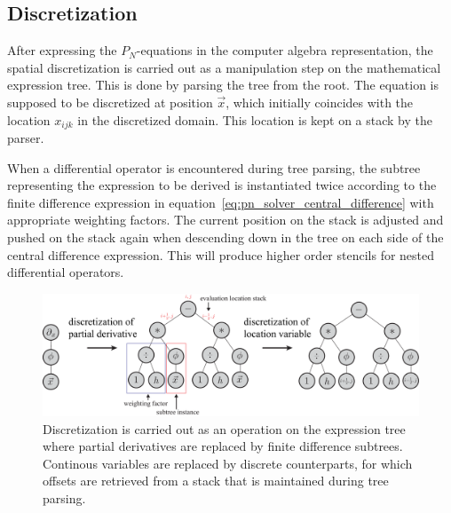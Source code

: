 \subsection{Discretization}
\label{sec:pn_stencil_gen}

After expressing the $P_N$-equations in the computer algebra representation, the spatial discretization is carried out as a manipulation step on the mathematical expression tree. This is done by parsing the tree from the root. The equation is supposed to be discretized at position $\vec{x}$, which initially coincides with the location $x_{ijk}$ in the discretized domain. This location is kept on a stack by the parser.

When a differential operator is encountered during tree parsing, the subtree representing the expression to be derived is instantiated twice according to the finite difference expression in equation~\ref{eq:pn_solver_central_difference} with appropriate weighting factors. The current position on the stack is adjusted and pushed on the stack again when descending down in the tree on each side of the central difference expression. This will produce higher order stencils for nested differential operators.
\begin{figure}[h]
\centering
\includegraphics[width=1.0\textwidth]{04_pn_method/figures/fig_car_discretization.pdf}
\caption{Discretization is carried out as an operation on the expression tree where partial derivatives are replaced by finite difference subtrees. Continous variables are replaced by discrete counterparts, for which offsets are retrieved from a stack that is maintained during tree parsing.}
\label{fig:pn_discretization_differential}
\end{figure}

